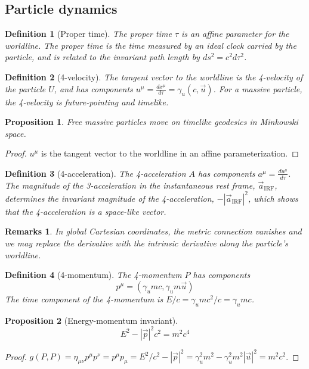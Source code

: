 \documentclass[a4paper]{article}
\newtheorem{remarks}{Remarks}[section]
\theoremstyle{new}
\newtheorem{defi}{Definition}[section]
\newtheorem{prop}{Proposition}[section]
\begin{document}
\subsection{Particle dynamics}
\begin{defi}[Proper time]
The proper time $\tau$ is an affine parameter for the worldline. The proper time is the time measured by an ideal clock carried by the particle, and is related to the invariant path length by $ds^2=c^2d\tau^2$.
\end{defi}
\begin{defi}[4-velocity]
The tangent vector to the worldline is the 4-velocity of the particle $U$, and has components $u^\mu=\frac{dx^\mu}{d\tau}=\gamma_u(c,\vec{u})$. For a massive particle, the 4-velocity is future-pointing and timelike.
\end{defi}
\begin{prop}
Free massive particles move on timelike geodesics in Minkowski space.
\end{prop}
\begin{proof}
$u^\mu$ is the tangent vector to the worldline in an affine parameterization.
\end{proof}
\begin{defi}[4-acceleration]
The 4-acceleration $A$ has components $a^\mu=\frac{du^\mu}{d\tau}$. The magnitude of the 3-acceleration in the instantaneous rest frame, $\vec{a}_{\text{IRF}}$, determines the invariant magnitude of the 4-acceleration, $-|\vec{a}_{\text{IRF}}|^2$, which shows that the 4-acceleration is a space-like vector.
\end{defi}
\begin{remarks}
In global Cartesian coordinates, the metric connection vanishes and we may replace the derivative with the intrinsic derivative along the particle's worldline.
\end{remarks}
\begin{defi}[4-momentum]
The 4-momentum $P$ has components
\begin{equation}
p^\mu=(\gamma_umc,\gamma_um\vec{u})\label{4-momentum}
\end{equation}
The time component of the 4-momentum is $E/c=\gamma_umc^2/c=\gamma_umc$.
\end{defi}
\begin{prop}[Energy-momentum invariant]
\begin{equation}
E^2-|\vec{p}|^2c^2=m^2c^4\label{energymomentum}
\end{equation}
\end{prop}
\begin{proof}$g(P,P)=\eta_{\mu\nu}p^\mu p^\nu=p^\mu p_\mu=E^2/c^2-|\vec{p}|^2=\gamma_u^2m^2-\gamma_u^2m^2|\vec{u}|^2=m^2c^2$.
\end{proof}
\end{document}

